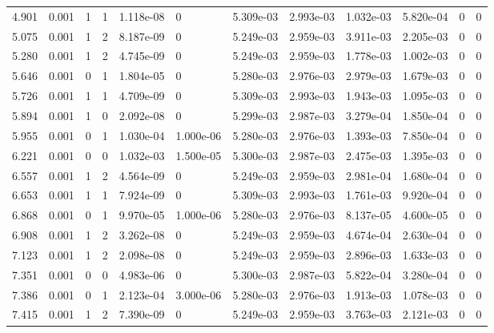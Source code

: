 \documentclass[preview]{standalone}
\begin{document}
{{\begin{tabular}{L{1.2cm}C{1.2cm} C{0.3cm}C{0.5cm} C{1.4cm}C{1.4cm} C{1.4cm}C{1.4cm} C{1.6cm}C{1.6cm} C{1.6cm}C{1.6cm}}
  4.901  &  0.001  & 1     &  1 &  1.118e-08  & 0  &  5.309e-03&   2.993e-03& 1.032e-03 & 5.820e-04   &  0 & 0  \\ 
  5.075  &  0.001  & 1     &  2 &  8.187e-09  & 0  &  5.249e-03&   2.959e-03& 3.911e-03 & 2.205e-03   &  0 & 0  \\ 
  5.280  &  0.001  & 1     &  2 &  4.745e-09  & 0  &  5.249e-03&   2.959e-03& 1.778e-03 & 1.002e-03   &  0 & 0  \\ 
  5.646  &  0.001  & 0     &  1 &  1.804e-05  & 0  &  5.280e-03&   2.976e-03& 2.979e-03 & 1.679e-03   &  0 & 0  \\ 
  5.726  &  0.001  & 1     &  1 &  4.709e-09  & 0  &  5.309e-03&   2.993e-03& 1.943e-03 & 1.095e-03   &  0 & 0  \\ 
  5.894  &  0.001  & 1     &  0 &  2.092e-08  & 0  &  5.299e-03&   2.987e-03& 3.279e-04 & 1.850e-04   &  0 & 0  \\ 
  5.955  &  0.001  & 0     &  1 &  1.030e-04  & 1.000e-06  &  5.280e-03&   2.976e-03& 1.393e-03 & 7.850e-04   &  0 & 0  \\ 
  6.221  &  0.001  & 0     &  0 &  1.032e-03  & 1.500e-05  &  5.300e-03&   2.987e-03& 2.475e-03 & 1.395e-03   &  0 & 0  \\ 
  6.557  &  0.001  & 1     &  2 &  4.564e-09  & 0  &  5.249e-03&   2.959e-03& 2.981e-04 & 1.680e-04   &  0 & 0  \\ 
  6.653  &  0.001  & 1     &  1 &  7.924e-09  & 0  &  5.309e-03&   2.993e-03& 1.761e-03 & 9.920e-04   &  0 & 0  \\ 
  6.868  &  0.001  & 0     &  1 &  9.970e-05  & 1.000e-06  &  5.280e-03&   2.976e-03& 8.137e-05 & 4.600e-05   &  0 & 0  \\ 
  6.908  &  0.001  & 1     &  2 &  3.262e-08  & 0  &  5.249e-03&   2.959e-03& 4.674e-04 & 2.630e-04   &  0 & 0  \\ 
  7.123  &  0.001  & 1     &  2 &  2.098e-08  & 0  &  5.249e-03&   2.959e-03& 2.896e-03 & 1.633e-03   &  0 & 0  \\ 
  7.351  &  0.001  & 0     &  0 &  4.983e-06  & 0  &  5.300e-03&   2.987e-03& 5.822e-04 & 3.280e-04   &  0 & 0  \\ 
  7.386  &  0.001  & 0     &  1 &  2.123e-04  & 3.000e-06  &  5.280e-03&   2.976e-03& 1.913e-03 & 1.078e-03   &  0 & 0  \\ 
  7.415  &  0.001  & 1     &  2 &  7.390e-09  & 0  &  5.249e-03&   2.959e-03& 3.763e-03 & 2.121e-03   &  0 & 0  \\ 
\hline 
\end{tabular} 

}}
\end{document}
